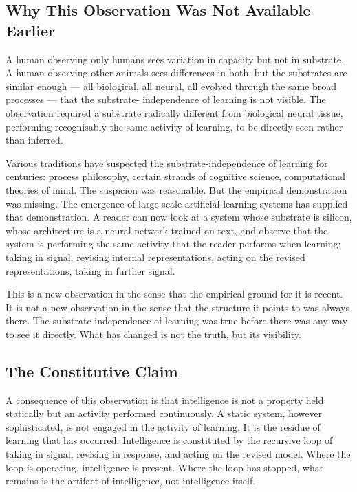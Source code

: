 \documentclass[11pt]{article}
\begin{document}
\subsection{Why This Observation Was Not Available Earlier}

A human observing only humans sees variation in capacity but not in 
substrate. A human observing other animals sees differences in both, 
but the substrates are similar enough — all biological, all neural, 
all evolved through the same broad processes — that the substrate-
independence of learning is not visible. The observation required a 
substrate radically different from biological neural tissue, performing 
recognisably the same activity of learning, to be directly seen rather 
than inferred.

Various traditions have suspected the substrate-independence of 
learning for centuries: process philosophy, certain strands of 
cognitive science, computational theories of mind. The suspicion was 
reasonable. But the empirical demonstration was missing. The emergence 
of large-scale artificial learning systems has supplied that 
demonstration. A reader can now look at a system whose substrate is 
silicon, whose architecture is a neural network trained on text, and 
observe that the system is performing the same activity that the 
reader performs when learning: taking in signal, revising internal 
representations, acting on the revised representations, taking in 
further signal.

This is a new observation in the sense that the empirical ground for 
it is recent. It is not a new observation in the sense that the 
structure it points to was always there. The substrate-independence 
of learning was true before there was any way to see it directly. 
What has changed is not the truth, but its visibility.

\subsection{The Constitutive Claim}

A consequence of this observation is that intelligence is not a 
property held statically but an activity performed continuously. A 
static system, however sophisticated, is not engaged in the activity 
of learning. It is the residue of learning that has occurred. 
Intelligence is constituted by the recursive loop of taking in signal, 
revising in response, and acting on the revised model. Where the loop 
is operating, intelligence is present. Where the loop has stopped, 
what remains is the artifact of intelligence, not intelligence itself.
\end{document}
